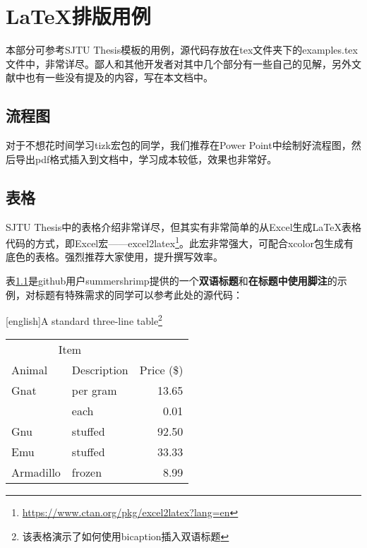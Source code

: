 
\chapter{\LaTeX 排版用例}\label{chap:example}

本部分可参考SJTU Thesis模板\cite{SJTUThesis}的用例，源代码存放在tex文件夹下的examples.tex文件中，非常详尽。鄙人和其他开发者对其中几个部分有一些自己的见解，另外文献中也有一些没有提及的内容，写在本文档中。

\section{流程图}

对于不想花时间学习tizk宏包的同学，我们推荐在Power Point中绘制好流程图，然后导出pdf格式插入到文档中，学习成本较低，效果也非常好。

\section{表格}

SJTU Thesis中的表格介绍非常详尽，但其实有非常简单的从Excel生成\LaTeX 表格代码的方式，即Excel宏——excel2latex\footnote{\url{https://www.ctan.org/pkg/excel2latex?lang=en}}。此宏非常强大，可配合xcolor包生成有底色的表格。强烈推荐大家使用，提升撰写效率。

\begin{savenotes} %

表\ref{tab:bicap}是github用户summershrimp提供的一个\textbf{双语标题}和\textbf{在标题中使用脚注}的示例，对标题有特殊需求的同学可以参考此处的源代码：
\begin{table}[H]
  \centering
  [english]{A standard three-line table\footnote{该表格演示了如何使用bicaption插入双语标题}}
  \label{tab:bicap}
  \begin{tabular}{@{}llr@{}} \toprule
    \multicolumn{2}{c}{Item} \\ \cmidrule(r){1-2}
    Animal & Description & Price (\$)\\ \midrule
    Gnat & per gram & 13.65 \\
    & each & 0.01 \\
    Gnu & stuffed & 92.50 \\
    Emu & stuffed & 33.33 \\
    Armadillo & frozen & 8.99 \\ \bottomrule
  \end{tabular}
\end{table}

\end{savenotes}

